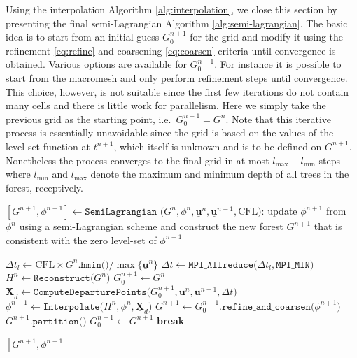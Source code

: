 Using the interpolation Algorithm \ref{alg:interpolation}, we close this section by presenting the final semi-Lagrangian Algorithm \ref{alg:semi-lagrangian}. The basic idea is to start from an initial guess $G^{n+1}_0$ for the grid and modify it using the refinement \eqref{eq:refine} and coarsening \eqref{eq:coarsen} criteria until convergence is obtained. Various options are available for $G^{n+1}_0$. For instance it is possible to start from the macromesh and only perform refinement steps until convergence. This choice, however, is not suitable since the first few iterations do not contain many cells and there is little work for parallelism. Here we simply take the previous grid as the starting point, i.e.\ $G^{n+1}_0 = G^n$. Note that this iterative process is essentially unavoidable since the grid is based on the values of the level-set function at $t^{n+1}$, which itself is unknown and is to be defined on $G^{n+1}$. Nonetheless the process converges to the final grid in at most $l_{\max}-l_{\min}$ steps where $l_{\min}$ and $l_{\max}$ denote the maximum and minimum depth of all trees in the forest, receptively.
\begin{algorithm}[htbp]
\caption{$[G^{n+1}, \phi^{n+1}] \gets \texttt{SemiLagrangian (}G^n, \phi^n, \underline{\mathbf{u}}^n, \underline{\mathbf{u}}^{n-1}, \text{CFL}\texttt{)}$: update $\phi^{n+1}$ from $\phi^n$ using a semi-Lagrangian scheme and construct the new forest $G^{n+1}$ that is consistent with the zero level-set of $\phi^{n+1}$}
\begin{algorithmic}[1]
\State $\Delta t_l \gets \text{CFL} \times G^n.\texttt{hmin()} / \max \{\underline{\mathbf{u}}^n \} $
\State $\Delta t   \gets \texttt{MPI\_Allreduce(}\Delta t_l,\texttt{MPI\_MIN)}$
\State $H^n \gets \texttt{Reconstruct(} G^n\texttt{)}$ 
\State $G^{n+1}_0 \gets G^n$
	\State $\underline{\mathbf{X}}_d  \gets \texttt{ComputeDeparturePoints(}G^{n+1}_0, \underline{\mathbf{u}}^n, \underline{\mathbf{u}}^{n-1}, \Delta t\texttt{)}$ 
	\State $\phi^{n+1} \gets \texttt{Interpolate(}H^n, \phi^n, \underline{\textbf{X}}_d\texttt{)}$
	\State $G^{n+1} \gets G^{n+1}_0.\texttt{refine\_and\_coarsen(}\phi^{n+1}\texttt{)}$ 
		\State $G^{n+1}.\texttt{partition()}$
		\State $G^{n+1}_0 \gets G^{n+1}$
	\Else
		\State \textbf{break}
	\EndIf
\EndWhile

\State \Return $[G^{n+1}, \phi^{n+1}]$
\end{algorithmic}
\label{alg:semi-lagrangian}
\end{algorithm}

